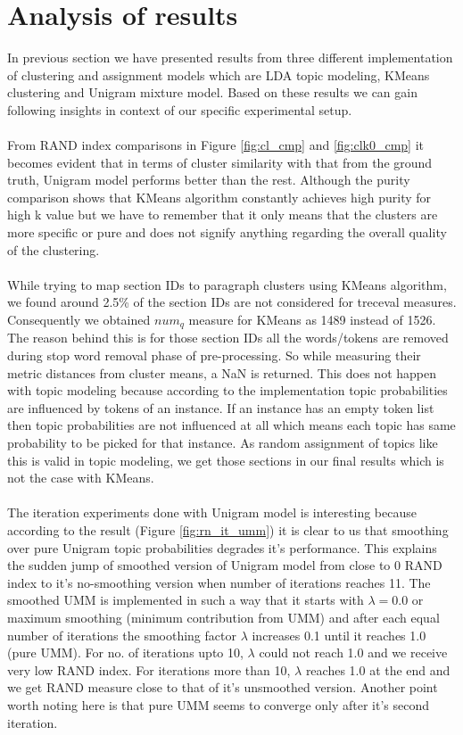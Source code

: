 \section{Analysis of results}
In previous section we have presented results from three different implementation of clustering and assignment models which are LDA topic modeling, KMeans clustering and Unigram mixture model. Based on these results we can gain following insights in context of our specific experimental setup.
\paragraph{} From RAND index comparisons in Figure \ref{fig:cl_cmp} and \ref{fig:clk0_cmp} it becomes evident that in terms of cluster similarity with that from the ground truth, Unigram model performs better than the rest. Although the purity comparison shows that KMeans algorithm constantly achieves high purity for high k value but we have to remember that it only means that the clusters are more specific or pure and does not signify anything regarding the overall quality of the clustering.
\paragraph{} While trying to map section IDs to paragraph clusters using KMeans algorithm, we found around 2.5\% of the section IDs are not considered for treceval measures. Consequently we obtained $num_q$ measure for KMeans as 1489 instead of 1526. The reason behind this is for those section IDs all the words/tokens are removed during stop word removal phase of pre-processing. So while measuring their metric distances from cluster means, a NaN is returned. This does not happen with topic modeling because according to the implementation topic probabilities are influenced by tokens of an instance. If an instance has an empty token list then topic probabilities are not influenced at all which means each topic has same probability to be picked for that instance. As random assignment of topics like this is valid in topic modeling, we get those sections in our final results which is not the case with KMeans.
\paragraph{} The iteration experiments done with Unigram model is interesting because according to the result (Figure \ref{fig:rn_it_umm}) it is clear to us that smoothing over pure Unigram topic probabilities degrades it's performance. This explains the sudden jump of smoothed version of Unigram model from close to 0 RAND index to it's no-smoothing version when number of iterations reaches 11. The smoothed UMM is implemented in such a way that it starts with $\lambda = 0.0$ or maximum smoothing (minimum contribution from UMM) and after each equal number of iterations the smoothing factor   $ \lambda$ increases 0.1 until it reaches 1.0 (pure UMM). For no. of iterations upto 10, $ \lambda$ could not reach 1.0 and we receive very low RAND index. For iterations more than 10, $ \lambda$ reaches 1.0 at the end and we get RAND measure close to that of it's unsmoothed version. Another point worth noting here is that pure UMM seems to converge only after it's second iteration.
